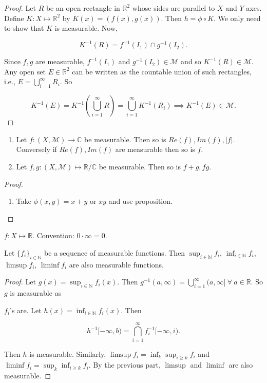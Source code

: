 \documentclass{functionspaces}
\begin{document}
\begin{proof}
Let $R$ be an open rectangle in $\mathbb{R}^{2}$ whose sides are parallel to $X$ and $Y$ axes. Define $K:X \mapsto \mathbb{R}^{2}$ by $K(x) = (f(x),g(x))$. Then $h = \phi \circ K$. We only need to show that $K$ is measurable. Now,

\[
K^{-1}(R) = f^{-1}(I_{1}) \cap g^{-1}(I_{2}).
\]

Since $f,g$ are measurable, $f^{-1}(I_{1})$ and $g^{-1}(I_{2}) \in \mathcal{M}$ and so $K^{-1}(R) \in \mathcal{M}$. Any open set $E \in \mathbb{R}^{2}$ can be written as the countable union of such rectangles, i.e., $E = \bigcup_{i=1}^{\infty} R_{i}$. So

\[
K^{-1}(E) = K^{-1}\left(\bigcup_{i=1}^{\infty} R\right) = \bigcup_{i=1}^{\infty} K^{-1}(R_{i}) \implies K^{-1}(E) \in \mathcal{M}.
\]
\end{proof}

\begin{corollary}
\begin{enumerate}
    \item Let $f:(X,\mathcal{M}) \to \mathbb{C}$ be measurable. Then so is $Re(f),Im(f),|f|$. Conversely if $Re(f),Im(f)$ are measurable then so is $f$.
    
    \item Let $f,g:(X,\mathcal{M}) \mapsto \mathbb{R}/\mathbb{C}$ be measurable. Then so is $f+g,fg$.
\end{enumerate}
\end{corollary}

\begin{proof}
\begin{enumerate}
    \item[2.] Take $\phi(x,y) = x+y$ or $xy$ and use proposition.
\end{enumerate}
\end{proof}

\begin{remark}
$f:X \mapsto \mathbb{R}$. Convention: $0 \cdot \infty = 0$.
\end{remark}

\begin{proposition}
Let $\{f_{i}\}_{i \in \mathbb{N}}$ be a sequence of measurable functions. Then $\sup_{i \in \mathbb{N}} f_{i}$, $\inf_{i \in \mathbb{N}} f_{i}$, $\limsup f_{i}$, $\liminf f_{i}$ are also measurable functions.
\end{proposition}

\begin{proof}
Let $g(x) = \sup_{i \in \mathbb{N}} f_{i}(x)$. Then $g^{-1}(a,\infty) = \bigcup_{i=1}^{\infty} (a,\infty]\ \forall\ a \in \mathbb{R}$. So $g$ is measurable as

$f_{i}$'s are. Let $h(x) = \inf_{i \in \mathbb{N}} f_{i}(x)$. Then

\[
h^{-1}[-\infty,b) = \bigcap_{i=1}^{\infty} f_{i}^{-1}[-\infty,i).
\]

Then $h$ is measurable. Similarly, $\limsup f_{i} = \inf_{k} \sup_{i \geq k} f_{i}$ and $\liminf f_{i} = \sup_{k} \inf_{i \geq k} f_{i}$. By the previous part, $\limsup$ and $\liminf$ are also measurable.
\end{proof}
\end{document}
